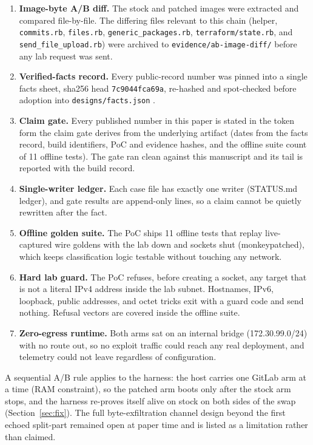 \documentclass[journal]{IEEEtran}
\begin{document}
\begin{enumerate}
\item \textbf{Image-byte A/B diff.} The stock and patched images were
extracted and compared file-by-file. The differing files relevant to this
chain (helper, \texttt{commits.rb}, \texttt{files.rb},
\texttt{generic\_packages.rb}, \texttt{terraform/state.rb}, and
\texttt{send\_file\_upload.rb}) were archived to
\texttt{evidence/ab-image-diff/} before any lab request was sent.
\item \textbf{Verified-facts record.} Every public-record number was pinned
into a single facts sheet, sha256 head \texttt{7c9044fca69a}, re-hashed and
spot-checked before adoption into \texttt{designs/facts.json} \cite{facts}.
\item \textbf{Claim gate.} Every published number in this paper is stated in
the token form the claim gate derives from the underlying artifact (dates from
the facts record, build identifiers, PoC and evidence hashes, and the offline
suite count of 11 offline tests). The gate ran clean against this manuscript
and its tail is reported with the build record.
\item \textbf{Single-writer ledger.} Each case file has exactly one writer
(STATUS.md ledger), and gate results are append-only lines, so a claim cannot
be quietly rewritten after the fact.
\item \textbf{Offline golden suite.} The PoC ships 11 offline tests that
replay live-captured wire goldens with the lab down and sockets shut
(monkeypatched), which keeps classification logic testable without touching
any network.
\item \textbf{Hard lab guard.} The PoC refuses, before creating a socket, any
target that is not a literal IPv4 address inside the lab subnet. Hostnames,
IPv6, loopback, public addresses, and octet tricks exit with a guard code and
send nothing. Refusal vectors are covered inside the offline suite.
\item \textbf{Zero-egress runtime.} Both arms sat on an internal bridge
(172.30.99.0/24) with no route out, so no exploit traffic could reach any real
deployment, and telemetry could not leave regardless of configuration.
\end{enumerate}

A sequential A/B rule applies to the harness: the host carries one GitLab arm
at a time (RAM constraint), so the patched arm boots only after the stock arm
stops, and the harness re-proves itself alive on stock on both sides of the
swap (Section~\ref{sec:fix}). The full byte-exfiltration channel design beyond
the first echoed split-part remained open at paper time and is listed as a
limitation rather than claimed.
\end{document}
